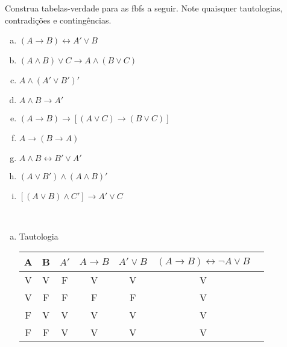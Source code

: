 \documentclass[a4paper, 12pt, addpoints]{exam}
\begin{document}
\begin{questions}
  \question Construa tabelas-verdade para as fbfs a seguir. Note quaisquer tautologias,
  contradições e contingências.
  \begin{multicols}{2}
    \begin{enumerate}[a)]
      \item $(A \rightarrow B) \leftrightarrow A' \vee B$
      \item $(A \wedge B) \vee C \rightarrow A \wedge (B \vee C)$
      \item $A \wedge (A' \vee B')'$
      \item $A \wedge B \rightarrow A'$
      \item $(A \rightarrow B) \rightarrow [(A \vee C) \rightarrow ( B \vee C)]$
      \item $A \rightarrow (B \rightarrow A)$
      \item $A \wedge B \leftrightarrow B' \vee A'$
      \item $(A \vee B') \wedge (A \wedge B)'$
      \item $[(A \vee B) \wedge C'] \rightarrow A' \vee C$
    \end{enumerate}
  \end{multicols}
  \begin{resp}~

    \begin{enumerate}[a)]
      \item Tautologia \\
      \begin{tabular}{|c|c|c|c|c|c|c|}
        \hline
        A & B & $ A' $ & $A \rightarrow B$ & $A' \lor B$ & $(A \rightarrow B) \leftrightarrow \lnot A \lor B$ \\
        \hline
        V & V & F & V & V & V \\
        V & F & F & F & F & V \\
        F & V & V & V & V & V \\
        F & F & V & V & V & V \\
        \hline
      \end{tabular}
      

\end{enumerate}
\end{resp}
\end{questions}
\end{document}
